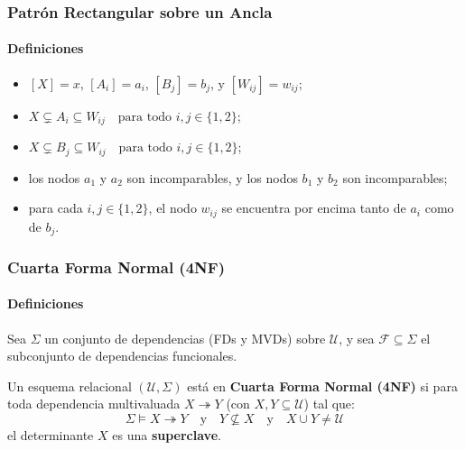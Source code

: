 \documentclass[aspectratio=169,12pt]{beamer}
\begin{document}
\begin{frame}
    \frametitle{Patrón Rectangular sobre un Ancla}
    \framesubtitle{Definiciones}

    \begin{itemize}
        \item[(i)] $[X] = x$, $[A_i] = a_i$, $[B_j] = b_j$, y $[W_{ij}] = w_{ij}$;
        
        \vspace{0.2cm}
        
        \item[(ii)] $X \subsetneq A_i \subseteq W_{ij} \quad \text{para todo } i, j \in \{1, 2\}$;
        
        \vspace{0.2cm}
        
        \item[(iii)] $X \subsetneq B_j \subseteq W_{ij} \quad \text{para todo } i, j \in \{1, 2\}$;
        
        \vspace{0.2cm}
        
        \item[(iv)] los nodos $a_1$ y $a_2$ son incomparables, y los nodos $b_1$ y $b_2$ son incomparables;
        
        \vspace{0.2cm}
        
        \item[(v)] para cada $i, j \in \{1, 2\}$, el nodo $w_{ij}$ se encuentra por encima tanto de $a_i$ como de $b_j$.
    \end{itemize}
\end{frame}

\begin{frame}
    \frametitle{Cuarta Forma Normal (4NF)}
    \framesubtitle{Definiciones}

    Sea $\Sigma$ un conjunto de dependencias (FDs y MVDs) sobre $\mathcal{U}$, y sea $\mathcal{F} \subseteq \Sigma$ el subconjunto de dependencias funcionales.
    
    \vspace{0.4cm}

    Un esquema relacional $(\mathcal{U}, \Sigma)$ está en \textbf{Cuarta Forma Normal (4NF)} si para toda dependencia multivaluada $X \twoheadrightarrow Y$ (con $X, Y \subseteq \mathcal{U}$) tal que:
    \[ \Sigma \vDash X \twoheadrightarrow Y \quad \text{y} \quad Y \not\subseteq X \quad \text{y} \quad X \cup Y \neq \mathcal{U} \]
    el determinante $X$ es una \textbf{superclave}.
\end{frame}

\SlideBackCover{}
\end{document}
